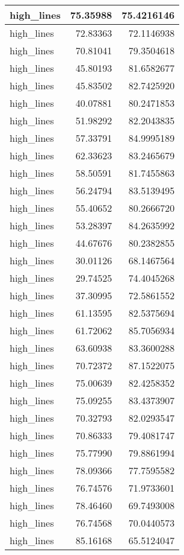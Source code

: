 \documentclass[
]{book}
\theoremstyle{definition}
\theoremstyle{definition}
\theoremstyle{definition}
\theoremstyle{definition}
\theoremstyle{remark}
\begin{document}
\begin{tabular}{l|r|r}
\hline
high\_lines & 75.35988 & 75.4216146\\
\hline
high\_lines & 72.83363 & 72.1146938\\
\hline
high\_lines & 70.81041 & 79.3504618\\
\hline
high\_lines & 45.80193 & 81.6582677\\
\hline
high\_lines & 45.83502 & 82.7425920\\
\hline
high\_lines & 40.07881 & 80.2471853\\
\hline
high\_lines & 51.98292 & 82.2043835\\
\hline
high\_lines & 57.33791 & 84.9995189\\
\hline
high\_lines & 62.33623 & 83.2465679\\
\hline
high\_lines & 58.50591 & 81.7455863\\
\hline
high\_lines & 56.24794 & 83.5139495\\
\hline
high\_lines & 55.40652 & 80.2666720\\
\hline
high\_lines & 53.28397 & 84.2635992\\
\hline
high\_lines & 44.67676 & 80.2382855\\
\hline
high\_lines & 30.01126 & 68.1467564\\
\hline
high\_lines & 29.74525 & 74.4045268\\
\hline
high\_lines & 37.30995 & 72.5861552\\
\hline
high\_lines & 61.13595 & 82.5375694\\
\hline
high\_lines & 61.72062 & 85.7056934\\
\hline
high\_lines & 63.60938 & 83.3600288\\
\hline
high\_lines & 70.72372 & 87.1522075\\
\hline
high\_lines & 75.00639 & 82.4258352\\
\hline
high\_lines & 75.09255 & 83.4373907\\
\hline
high\_lines & 70.32793 & 82.0293547\\
\hline
high\_lines & 70.86333 & 79.4081747\\
\hline
high\_lines & 75.77990 & 79.8861994\\
\hline
high\_lines & 78.09366 & 77.7595582\\
\hline
high\_lines & 76.74576 & 71.9733601\\
\hline
high\_lines & 78.46460 & 69.7493008\\
\hline
high\_lines & 76.74568 & 70.0440573\\
\hline
high\_lines & 85.16168 & 65.5124047\\

\end{tabular}
\end{document}
